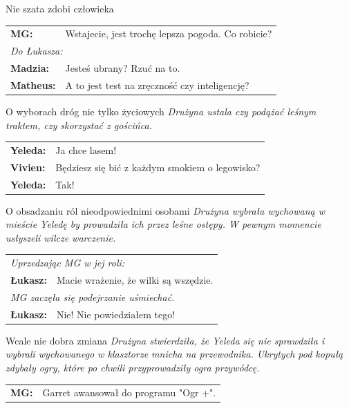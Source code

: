 \documentclass[10pt,twoside,twocolumn]{book}
\begin{document}
\begin{rpg-quotebox}{Nie szata zdobi człowieka}
   \begin{tabularx}{\columnwidth}{lX}
      \textbf{MG:} & Wstajecie, jest trochę lepsza pogoda. Co robicie?\\
      \multicolumn{2}{l}{\textit{Do Łukasza:}}\\
      \textbf{Madzia:} & Jesteś ubrany? Rzuć na to.\\
      \textbf{Matheus:} & A to jest test na zręczność czy inteligencję?\\
   \end{tabularx}
\end{rpg-quotebox}

\begin{rpg-quotebox}{O wyborach dróg nie tylko życiowych}
   \textit{Drużyna ustala czy podążać leśnym traktem, czy skorzystać z gościńca.}\\
   
   \begin{tabularx}{\columnwidth}{lX}
      \textbf{Yeleda:} & Ja chce lasem!\\
      \textbf{Vivien:} & Będziesz się bić z każdym smokiem o legowisko?\\
      \textbf{Yeleda:} & Tak!\\
   \end{tabularx}
\end{rpg-quotebox}

\begin{rpg-quotebox}{O obsadzaniu ról nieodpowiednimi osobami}
   \textit{Drużyna wybrała wychowaną w mieście Yeledę by prowadziła ich przez leśne ostępy. W pewnym momencie usłyszeli wilcze warczenie.}\\
   
   \begin{tabularx}{\columnwidth}{lX}
      \multicolumn{2}{l}{\textit{Uprzedzając MG w jej roli:}}\\
      \textbf{Łukasz:} & Macie wrażenie, że wilki są wszędzie.\\
      \multicolumn{2}{l}{\textit{MG zaczęła się podejrzanie uśmiechać.}}\\
      \textbf{Łukasz:} & Nie! Nie powiedziałem tego!\\
   \end{tabularx}
\end{rpg-quotebox}

\begin{rpg-quotebox}{Wcale nie dobra zmiana}
   \textit{Drużyna stwierdziła, że Yeleda się nie sprawdziła i wybrali wychowanego w klasztorze mnicha na przewodnika. Ukrytych pod kopułą zdybały ogry, które po chwili przyprowadziły ogra przywódcę.}\\

   \begin{tabularx}{\columnwidth}{lX}
      \textbf{MG:} & Garret awansował do programu "Ogr +".\\
   \end{tabularx}
\end{rpg-quotebox}
\end{document}
